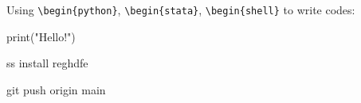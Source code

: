 \documentclass[10pt]{report}
\begin{document}
\no Using \verb=\begin{python}=, \verb=\begin{stata}=, \verb=\begin{shell}= to write codes:
\begin{python}
    print("Hello!")
\end{python}

\begin{stata}
    ss install reghdfe
\end{stata}

\begin{shell}
    git push origin main
\end{shell}

\newpage
\listoffigures

\newpage
\listofalgorithms



\end{document}

